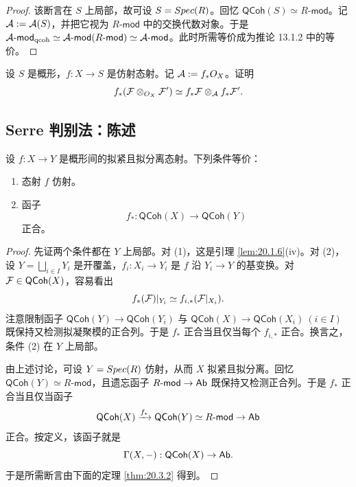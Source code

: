 \begin{proof}
该断言在 $S$ 上局部，故可设 $S=Spec(R)$。回忆 $\mathsf{QCoh}(S)\simeq R\text{-}\mathsf{mod}$。记 $\mathcal{A}:=\mathcal{A}(S)$，并把它视为 $R\text{-}\mathsf{mod}$ 中的交换代数对象。于是 $\mathcal{A}\text{-}\mathsf{mod}_{\mathrm{qcoh}}\simeq\mathcal{A}\text{-}\mathsf{mod}(R\text{-}\mathsf{mod})\simeq\mathcal{A}\text{-}\mathsf{mod}$。此时所需等价成为推论 13.1.2 中的等价。
\end{proof}

\begin{exercise}\label{exc:20.2.3}
设 $S$ 是概形，$f:X\to S$ 是仿射态射。记 $\mathcal{A}:=f_*O_X$。证明
\[
f_*(\mathcal{F}\otimes_{O_X}\mathcal{F}')\simeq f_*\mathcal{F}\otimes_{\mathcal{A}} f_*\mathcal{F}'.
\]
\end{exercise}

\subsection{Serre 判别法：陈述}\label{sec:20.3}

\begin{theorem}[Serre]\label{thm:20.3.1}
设 $f:X\to Y$ 是概形间的拟紧且拟分离态射。下列条件等价：
\begin{enumerate}[label=(\roman*),leftmargin=2em,itemsep=0.25ex]
  \item 态射 $f$ 仿射。
  \item 函子
  \[
  f_*:\mathsf{QCoh}(X)\to\mathsf{QCoh}(Y)
  \]
  正合。
\end{enumerate}
\end{theorem}

\begin{proof}
先证两个条件都在 $Y$ 上局部。对 (1)，这是引理 \ref{lem:20.1.6}(iv)。对 (2)，设 $Y=\bigsqcup_{i\in I}Y_i$ 是开覆盖，$f_i:X_i\to Y_i$ 是 $f$ 沿 $Y_i\to Y$ 的基变换。对 $\mathcal{F}\in\mathsf{QCoh}(X)$，容易看出
\[
f_*(\mathcal{F})|_{Y_i}\simeq f_{i,*}(\mathcal{F}|_{X_i}).
\]
注意限制函子 $\mathsf{QCoh}(Y)\to\mathsf{QCoh}(Y_i)$ 与 $\mathsf{QCoh}(X)\to\mathsf{QCoh}(X_i)\ (i\in I)$ 既保持又检测拟凝聚模的正合列。于是 $f_*$ 正合当且仅当每个 $f_{i,*}$ 正合。换言之，条件 (2) 在 $Y$ 上局部。

由上述讨论，可设 $Y=Spec(R)$ 仿射，从而 $X$ 拟紧且拟分离。回忆 $\mathsf{QCoh}(Y)\simeq R\text{-}\mathsf{mod}$，且遗忘函子 $R\text{-}\mathsf{mod}\to\mathsf{Ab}$ 既保持又检测正合列。于是 $f_*$ 正合当且仅当函子
\[
\mathsf{QCoh}(X)\xrightarrow{f_*}\mathsf{QCoh}(Y)\simeq R\text{-}\mathsf{mod}\to\mathsf{Ab}
\]
正合。按定义，该函子就是
\[
\Gamma(X,-):\mathsf{QCoh}(X)\to\mathsf{Ab}.
\]
于是所需断言由下面的定理 \ref{thm:20.3.2} 得到。
\end{proof}

